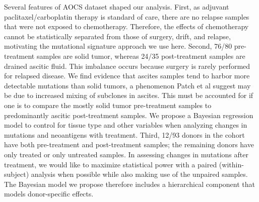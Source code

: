 Several features of AOCS dataset shaped our analysis. First, as adjuvant paclitaxel/carboplatin therapy is standard of care, there are no relapse samples that were not exposed to chemotherapy. Therefore, the effects of chemotherapy cannot be statistically separated from those of surgery, drift, and relapse, motivating the mutational signature approach we use here. Second, 76/80 pre-treatment samples are solid tumor, whereas 24/35 post-treatment samples are drained ascitic fluid. This imbalance occurs because surgery is rarely performed for relapsed disease. We find evidence that ascites samples tend to harbor more detectable mutations than solid tumors, a phenomenon Patch et al suggest may be due to increased mixing of subclones in ascites. This must be accounted for if one is to compare the mostly solid tumor pre-treatment samples to predominantly ascitic post-treatment samples. We propose a Bayesian regression model to control for tissue type and other variables when analyzing changes in mutations and neoantigens with treatment. Third, 12/93 donors in the cohort have both pre-treatment and post-treatment samples; the remaining donors have only treated or only untreated samples. In assessing changes in mutations after treatment, we would like to maximize statistical power with a paired (within-subject) analysis when possible while also making use of the unpaired samples. The Bayesian model we propose therefore includes a hierarchical component that models donor-specific effects.
